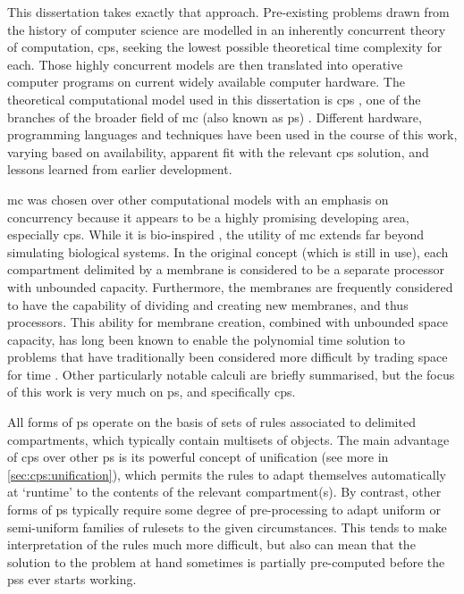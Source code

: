 This dissertation takes exactly that approach.  Pre-existing problems drawn from the history of computer science are modelled in an inherently concurrent theory of computation, \gls{cps}, seeking the lowest possible theoretical time complexity for each.  Those highly concurrent models are then translated into operative computer programs on current widely available computer hardware.  The theoretical computational model used in this dissertation is \gls{cps} \cite{Nicolescu2018}, one of the branches of the broader field of \gls{mc} (also known as \gls{ps}) \cite{Paun2010b,Paun2002}.  Different hardware, programming languages and techniques have been used in the course of this work, varying based on availability, apparent fit with the relevant \gls{cps} solution, and lessons learned from earlier development.

\Gls{mc} was chosen over other computational models with an emphasis on concurrency because it appears to be a highly promising developing area, especially \gls{cps}.  While it is bio-inspired \cite{Paun2000}, the utility of \gls{mc} extends far beyond simulating biological systems.  In the original concept (which is still in use), each \gls{compartment} delimited by a membrane is considered to be a separate processor with unbounded capacity.  Furthermore, the membranes are frequently considered to have the capability of dividing and creating new membranes, and thus processors.  This ability for membrane creation, combined with unbounded space capacity, has long been known to enable the polynomial time solution to problems that have traditionally been considered more difficult by trading space for time \cite{Paun1999a,Sosik2003}.
Other particularly notable calculi are briefly summarised, but the focus of this work is very much on \gls{ps}, and specifically \gls{cps}.

All forms of \gls{ps} operate on the basis of sets of rules associated to delimited \glspl{compartment}, which typically contain multisets of objects. The main advantage of \gls{cps} over other \gls{ps} is its powerful concept of unification (see more in \vref{sec:cps:unification}), which permits the rules to adapt themselves automatically at `runtime' to the contents of the relevant \gls{compartment}(s).  By contrast, other forms of \gls{ps} typically require some degree of pre-processing to adapt uniform or semi-uniform families of \glspl{ruleset} to the given circumstances.  This tends to make interpretation of the rules much more difficult, but also can mean that the solution to the problem at hand sometimes is partially pre-computed before the \glspl{ps} ever starts working.

